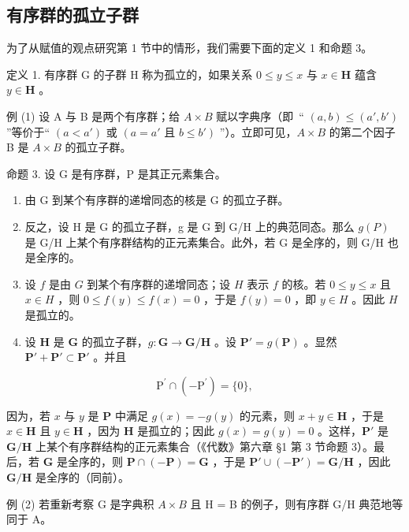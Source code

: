 \subsection{有序群的孤立子群}

为了从赋值的观点研究第 1 节中的情形，我们需要下面的定义 1 和命题 3。

定义 1. 有序群 G 的子群 H 称为孤立的，如果关系 \(0 \leqslant y \leqslant x\) 与 \(x \in \mathbf{H}\) 蕴含 \(y \in \mathbf{H}\) 。

例 (1) 设 A 与 B 是两个有序群；给 \(A \times B\) 赋以字典序（即~“ \((a, b) \leqslant (a', b')\) ”等价于“ \((a < a')\) 或 \((a = a' \text{ 且 } b \leqslant b')\) ”）。立即可见，\(A \times B\) 的第二个因子 B 是 \(A \times B\) 的孤立子群。

命题 3. 设 G 是有序群，P 是其正元素集合。

\begin{enumerate}
\def\labelenumi{(\alph{enumi})}
\item
  由 G 到某个有序群的递增同态的核是 G 的孤立子群。
\item
  反之，设 H 是 G 的孤立子群，g 是 G 到 G/H 上的典范同态。那么 \(g(P)\) 是 G/H 上某个有序群结构的正元素集合。此外，若 G 是全序的，则 G/H 也是全序的。
\item
  设 \(f\) 是由 \(G\) 到某个有序群的递增同态；设 \(H\) 表示 \(f\) 的核。若 \(0 \leqslant y \leqslant x\) 且 \(x \in H\) ，则 \(0 \leqslant f(y) \leqslant f(x) = 0\) ，于是 \(f(y) = 0\) ，即 \(y \in H\) 。因此 \(H\) 是孤立的。
\item
  设 \(\mathbf{H}\) 是 \(\mathbf{G}\) 的孤立子群，\(g\colon \mathbf{G}\to \mathbf{G} / \mathbf{H}\) 。设 \(\mathbf{P}' = g(\mathbf{P})\) 。显然 \(\mathbf{P}' + \mathbf{P}'\subset \mathbf{P}'\) 。并且
\end{enumerate}

\[
\mathrm{P} ^ {\prime} \cap (- \mathrm{P} ^ {\prime}) = \{0 \},
\]

因为，若 \(x\) 与 \(y\) 是 \(\mathbf{P}\) 中满足 \(g(x) = -g(y)\) 的元素，则 \(x + y \in \mathbf{H}\) ，于是 \(x \in \mathbf{H}\) 且 \(y \in \mathbf{H}\) ，因为 \(\mathbf{H}\) 是孤立的；因此 \(g(x) = g(y) = 0\) 。这样，\(\mathbf{P}'\) 是 \(\mathbf{G} / \mathbf{H}\) 上某个有序群结构的正元素集合（《代数》第六章 §1 第 3 节命题 3）。最后，若 \(\mathbf{G}\) 是全序的，则 \(\mathbf{P} \cap (-\mathbf{P}) = \mathbf{G}\) ，于是 \(\mathbf{P}' \cup (-\mathbf{P}') = \mathbf{G} / \mathbf{H}\) ，因此 \(\mathbf{G} / \mathbf{H}\) 是全序的（同前）。

例 (2) 若重新考察 G 是字典积 \(A \times B\) 且 H = B 的例子，则有序群 G/H 典范地等同于 A。

